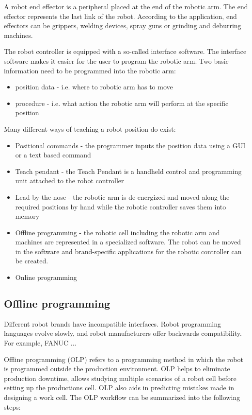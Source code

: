 A robot end effector is a peripheral placed at the end of the robotic arm. The end effector represents the last link of the robot. According to the application, end effectors can be grippers, welding devices, spray guns or grinding and deburring machines.

The robot controller is equipped with a so-called interface software. The interface software makes it easier for the user to program the robotic arm.  
Two basic information need to be programmed into the robotic arm:

\begin{itemize}
    \item position data - i.e. where to robotic arm has to move
    \item procedure - i.e. what action the robotic arm will perform at the specific position
\end{itemize}

Many different ways of teaching a robot position do exist:

\begin{itemize}
    \item Positional commands - the programmer inputs the position data using a GUI or a text based command
    \item Teach pendant - the Teach Pendant is a handheld control and programming unit attached to the robot controller
    \item Lead-by-the-nose - the robotic arm is de-energized and moved along the required positions by hand while the robotic controller saves them into memory
    \item Offline programming - the robotic cell including the robotic arm and machines are represented in a specialized software. The robot can be moved in the software and brand-specific applications for the robotic controller can be created. 
    \item Online programming

\end{itemize}

\subsection{Offline programming}
Different robot brands have incompatible interfaces. Robot programming languages evolve slowly, and robot manufacturers offer backwards compatibility. For example, FANUC ...

Offline programming  (OLP) refers to a programming method in which the robot is programmed outside the production environment. OLP helps to eliminate production downtime, allows studying multiple scenarios of a robot cell before setting up the productions cell. OLP also aids in predicting mistakes made in designing a work cell. The OLP workflow can be summarized into the following steps:


